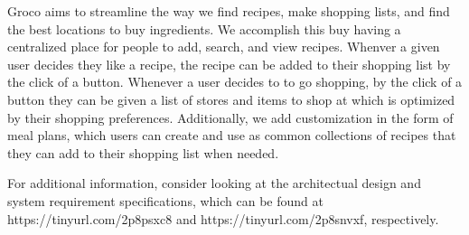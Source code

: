 Groco aims to streamline the way we find recipes, make shopping lists, and find the best locations to buy ingredients.  We accomplish this buy having a centralized place for people to add, search, and view recipes.  Whenver a given user decides they like a recipe, the recipe can be added to their shopping list by the click of a button.  Whenever a user decides to to go shopping, by the click of a button they can be given a list of stores and items to shop at which is optimized by their shopping preferences.  Additionally, we add customization in the form of meal plans, which users can create and use as common collections of recipes that they can add to their shopping list when needed.

For additional information, consider looking at the architectual design and system requirement specifications, which can be found at https://tinyurl.com/2p8psxc8 and https://tinyurl.com/2p8snvxf, respectively.